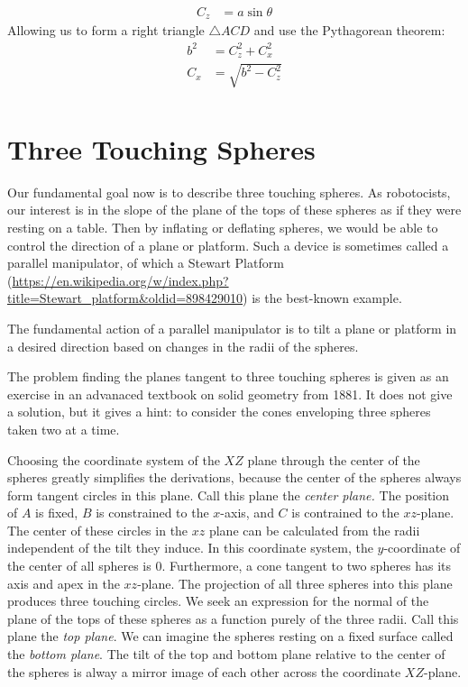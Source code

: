 \documentclass{article}
\begin{document}
\begin{align}
 C_z  &= a\sin{\theta}
\end{align}
Allowing us to form a right triangle $\triangle ACD$ and use the Pythagorean theorem:
\begin{align}
  b^2  &= C_z^2 + C_x^2 \\
  C_x   &= \sqrt{b^2 - C_z^2}  \\
\end{align}


\section{Three Touching Spheres}


Our fundamental goal now is to describe three touching spheres. As robotocists,
our interest is in the slope of the plane of the tops of these spheres
as if they were resting on a table. Then by inflating or deflating spheres,
we would be able to control the direction of a plane or platform.
Such a device is sometimes called a parallel manipulator, of which a
Stewart Platform\cite{wiki:stewart} (\url{https://en.wikipedia.org/w/index.php?title=Stewart_platform&oldid=898429010})
is the best-known example.

The fundamental action of a parallel manipulator is to tilt a plane or platform in a desired direction based
on changes in the radii of the spheres.

The problem finding the planes tangent to three touching spheres
is given as an exercise in an advanaced textbook on solid geometry from 1881\cite{payne1881}. It does not give a solution, but it gives a hint: to consider the cones enveloping
three spheres taken two at a time.

Choosing the coordinate system of the $XZ$ plane through the center of the spheres greatly
simplifies the derivations, because the center of the spheres always form tangent circles
in this plane. Call this plane the {\em center plane.} The position of $A$ is fixed, $B$ is constrained to the $x$-axis, and
$C$ is contrained to the $xz$-plane. The center of these circles in the $xz$ plane can be
calculated from the radii independent of the tilt they induce.
In this coordinate system, the $y$-coordinate of the center of all spheres is $0$.
Furthermore, a cone tangent to two spheres has its axis and apex in the $xz$-plane.
The projection of all three spheres into this plane produces three touching circles.
We seek an expression for the normal of the plane of the tops of these spheres as a function
purely of the three radii. Call this plane the {\em top plane}.
We can imagine the spheres resting on a fixed surface called the {\em bottom plane}.
The tilt of the top and bottom plane relative to the center of the spheres
is alway a mirror image of each other across the coordinate $XZ$-plane.
\end{document}
